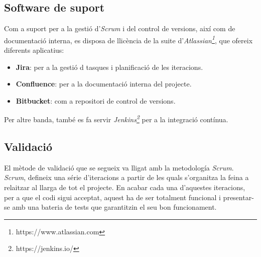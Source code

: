 \subsection{Software de suport}
Com a suport per a la gestió d'\textit{Scrum} i del control de versions, així com de documentació interna, es disposa de llicència de la suite d'\textit{Atlassian\footnote{https://www.atlassian.com}}, que ofereix diferents aplicatius:
\begin{itemize}
	\item \textbf{Jira}: per a la gestió d tasques i planificació de les iteracions.
	\item \textbf{Confluence}: per a la documentació interna del projecte.
	\item \textbf{Bitbucket}: com a repositori de control de versions.
\end{itemize}
Per altre banda, també es fa servir \textit{Jenkins\footnote{https://jenkins.io/}} per a la integració contínua.

\subsection{Validació}
El mètode de validació que se segueix va lligat amb la metodología \textit{Scrum}.\\
\textit{Scrum}, defineix una série d'iteracions a partir de les quals s'organitza la feina a relaitzar al llarga de tot el projecte. En acabar cada una d'aquestes iteracions, per a que el codi sigui acceptat,  aquest ha de ser totalment funcional i presentar-se amb una bateria de tests que garantitzin el seu bon funcionament.

















